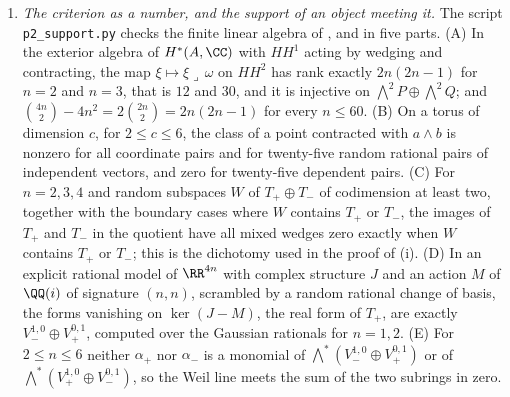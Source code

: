 \begin{enumerate}[label=\textup{(\Roman*)},leftmargin=*]
  $HH^{*}(A)=\bigwedge^{*}\bigl(H^{0,1}\oplus H^{0}(T_{A})\bigr)$, of
  dimension $2^{4n}$, as an exterior algebra on $4n$ operators indexed by bit
  masks, acting on $H^{*}(A,\CC)$ by wedging and contracting, and computes the
  annihilator of $\omega=a\alpha_{+}+b\alpha_{-}$ in every degree by exact
  rational elimination. It confirms that $P=V_{+}^{0,1}\oplus T_{-}$ is
  exactly the annihilator of $\alpha_{+}$ in degree one and
  $Q=V_{-}^{0,1}\oplus T_{+}$ that of $\alpha_{-}$, that
  $\Ann_{HH^{1}}(\omega)=0$, that $\Ann_{HH^{2}}(\omega)=P\wedge Q$ of
  dimension $4n^{2}$, that
  $\dim\Ann_{HH^{k}}(\omega)=\binom{4n}{k}-2\binom{2n}{k}+\delta_{k,2n}$
  in every degree $k\ge1$ (and $0$ in degree $0$), that the ideal generated by $P\wedge Q$ consists of the
  monomials meeting both halves and has codimension $2^{2n+1}-1$, that
  contraction with $\alpha_{-}$ is injective on $\bigwedge^{*}P$ and with
  $\alpha_{+}$ on $\bigwedge^{*}Q$ with the two images meeting in exactly one
  line in degree $2n$, and that
  $\dim HH^{2}-\dim\Ann_{HH^{2}}=2n(2n-1)$. The computation is run in every
  degree for $n=1$, where degree two is the exceptional degree $2n$ and the
  annihilator is one larger, and for $n=2$ with two choices of $(a,b)$, and in
  degrees up to three for $n=3$. That is  and
  .

\item \emph{The criterion as a number, and the support of an object meeting
  it.} The script \texttt{p2\_\allowbreak support.py} checks the finite
  linear algebra of ,  and
   in five parts. (A) In the exterior algebra of
  $H^{*}(A,\CC)$ with $HH^{1}$ acting by wedging and contracting, the map
  $\xi\mapsto\xi\lrcorner\,\omega$ on $HH^{2}$ has rank exactly $2n(2n-1)$
  for $n=2$ and $n=3$, that is $12$ and $30$, and it is injective on
  $\bigwedge^{2}P\oplus\bigwedge^{2}Q$; and
  $\binom{4n}{2}-4n^{2}=2\binom{2n}{2}=2n(2n-1)$ for every $n\le60$. (B) On a
  torus of dimension $c$, for $2\le c\le6$, the class of a point contracted
  with $a\wedge b$ is nonzero for all coordinate pairs and for twenty-five
  random rational pairs of independent vectors, and zero for twenty-five
  dependent pairs. (C) For $n=2,3,4$ and random subspaces $W$ of
  $T_{+}\oplus T_{-}$ of codimension at least two, together with the boundary
  cases where $W$ contains $T_{+}$ or $T_{-}$, the images of $T_{+}$ and
  $T_{-}$ in the quotient have all mixed wedges zero exactly when $W$
  contains $T_{+}$ or $T_{-}$; this is the dichotomy used in the proof of
  (i). (D) In an explicit rational model of $\RR^{4n}$
  with complex structure $J$ and an action $M$ of $\QQ(i)$ of signature
  $(n,n)$, scrambled by a random rational change of basis, the forms
  vanishing on $\ker(J-M)$, the real form of $T_{+}$, are exactly
  $V_{-}^{1,0}\oplus V_{+}^{0,1}$, computed over the Gaussian rationals for
  $n=1,2$. (E) For $2\le n\le6$ neither $\alpha_{+}$ nor $\alpha_{-}$ is a
  monomial of $\bigwedge^{*}(V_{-}^{1,0}\oplus V_{+}^{0,1})$ or of
  $\bigwedge^{*}(V_{+}^{1,0}\oplus V_{-}^{0,1})$, so the Weil line meets the
  sum of the two subrings in zero.


\end{enumerate}
